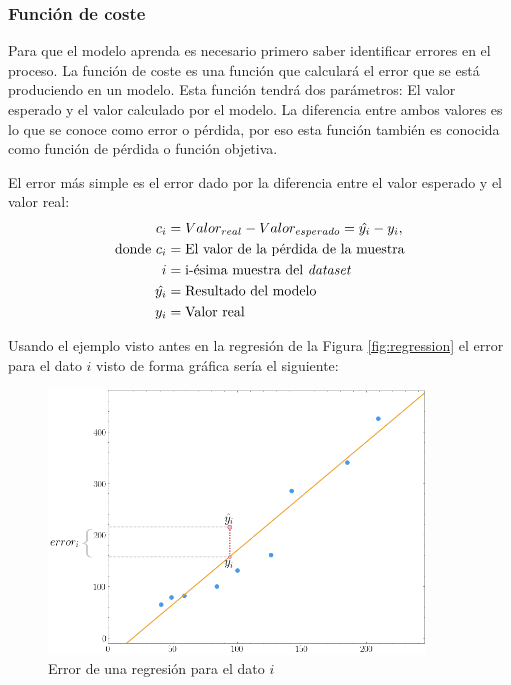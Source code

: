 \subsubsection{Función de coste}\label{costfunction}
Para que el modelo aprenda es necesario primero saber identificar errores en el proceso. La función de coste es una función que calculará el error que se está produciendo en un modelo. Esta función tendrá dos parámetros: El valor esperado y el valor calculado por el modelo. La diferencia entre ambos valores es lo que se conoce como error o pérdida, por eso esta función también es conocida como función de pérdida o función objetiva. 
\newline

El error más simple es el error dado por la diferencia entre el valor esperado y el valor real:
\newline
\begin{equation}
    \begin{split}
    c_i & = Valor_{real} - Valor_{esperado} = \hat{y_i} - y_i, \\ 
    \text{donde}~c_i &= \text{El valor de la pérdida de la muestra} \\
    i &= \text{i-ésima muestra del \textit{dataset}} \\
    ~\hat{y_i} &= \text{Resultado del modelo} \\
    ~y_i &= \text{Valor real}
  \end{split}
\end{equation}

Usando el ejemplo visto antes en la regresión de la Figura \ref{fig:regression} el error para el dato $i$ visto de forma gráfica sería el siguiente:

\begin{figure}[H]
    \centering
    \includegraphics[width=10cm]{images/state-of-art/cost-function/error_function.png}
    \caption{Error de una regresión para el dato $i$}
    \label{fig:error_regression}
\end{figure}


